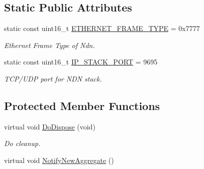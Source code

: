 \subsection*{Static Public Attributes}
\begin{DoxyCompactItemize}
\item 
static const uint16\+\_\+t \hyperlink{classns3_1_1ndn_1_1L3Protocol_ae964ffae6ec488df129aa7ac898f8c61}{E\+T\+H\+E\+R\+N\+E\+T\+\_\+\+F\+R\+A\+M\+E\+\_\+\+T\+Y\+PE} = 0x7777\hypertarget{classns3_1_1ndn_1_1L3Protocol_ae964ffae6ec488df129aa7ac898f8c61}{}\label{classns3_1_1ndn_1_1L3Protocol_ae964ffae6ec488df129aa7ac898f8c61}

\begin{DoxyCompactList}\small\item\em Ethernet Frame Type of Ndn. \end{DoxyCompactList}\item 
static const uint16\+\_\+t \hyperlink{classns3_1_1ndn_1_1L3Protocol_ab1751fa071c4d83968c866062fa0aa95}{I\+P\+\_\+\+S\+T\+A\+C\+K\+\_\+\+P\+O\+RT} = 9695\hypertarget{classns3_1_1ndn_1_1L3Protocol_ab1751fa071c4d83968c866062fa0aa95}{}\label{classns3_1_1ndn_1_1L3Protocol_ab1751fa071c4d83968c866062fa0aa95}

\begin{DoxyCompactList}\small\item\em T\+C\+P/\+U\+DP port for N\+DN stack. \end{DoxyCompactList}\end{DoxyCompactItemize}
\subsection*{Protected Member Functions}
\begin{DoxyCompactItemize}
\item 
virtual void \hyperlink{classns3_1_1ndn_1_1L3Protocol_a73cafd0adc52ac5909a974bb3203f923}{Do\+Dispose} (void)\hypertarget{classns3_1_1ndn_1_1L3Protocol_a73cafd0adc52ac5909a974bb3203f923}{}\label{classns3_1_1ndn_1_1L3Protocol_a73cafd0adc52ac5909a974bb3203f923}

\begin{DoxyCompactList}\small\item\em Do cleanup. \end{DoxyCompactList}\item 
virtual void \hyperlink{classns3_1_1ndn_1_1L3Protocol_a7f55324e375e710367bed078b146c081}{Notify\+New\+Aggregate} ()
\end{DoxyCompactItemize}


